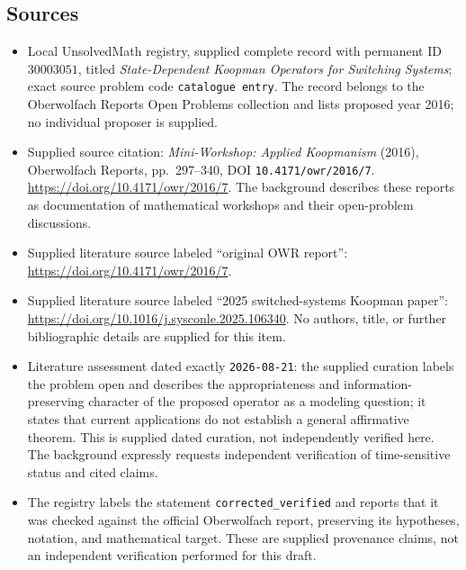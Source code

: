 \documentclass[11pt]{article}
\begin{document}
\subsection{Sources}
\begin{itemize}
\item Local UnsolvedMath registry, supplied complete record with permanent ID \(30003051\), titled \emph{State-Dependent Koopman Operators for Switching Systems}; exact source problem code \texttt{catalogue entry}. The record belongs to the Oberwolfach Reports Open Problems collection and lists proposed year 2016; no individual proposer is supplied.
\item Supplied source citation: \emph{Mini-Workshop: Applied Koopmanism} (2016), Oberwolfach Reports, pp.\ 297--340, DOI \texttt{10.4171/owr/2016/7}. \url{https://doi.org/10.4171/owr/2016/7}. The background describes these reports as documentation of mathematical workshops and their open-problem discussions.
\item Supplied literature source labeled ``original OWR report'': \url{https://doi.org/10.4171/owr/2016/7}.
\item Supplied literature source labeled ``2025 switched-systems Koopman paper'': \url{https://doi.org/10.1016/j.sysconle.2025.106340}. No authors, title, or further bibliographic details are supplied for this item.
\item Literature assessment dated exactly \texttt{2026-08-21}: the supplied curation labels the problem open and describes the appropriateness and information-preserving character of the proposed operator as a modeling question; it states that current applications do not establish a general affirmative theorem. This is supplied dated curation, not independently verified here. The background expressly requests independent verification of time-sensitive status and cited claims.
\item The registry labels the statement \texttt{corrected\_verified} and reports that it was checked against the official Oberwolfach report, preserving its hypotheses, notation, and mathematical target. These are supplied provenance claims, not an independent verification performed for this draft.
\end{itemize}
\end{document}
